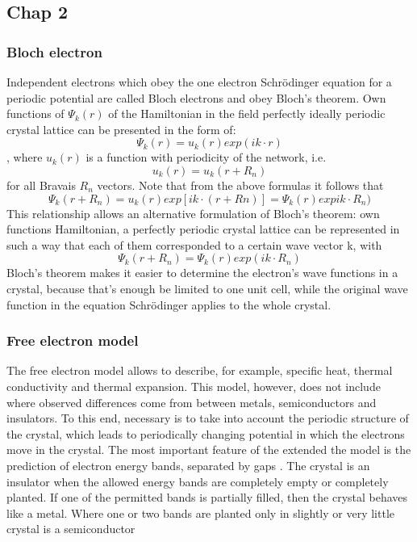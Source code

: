 \subsection{Chap 2} \label{chap2}

\subsubsection*{Bloch electron}
Independent electrons which obey the one electron Schrödinger equation for a periodic potential are called Bloch
electrons and obey Bloch’s theorem. Own functions of $\Psi_k(r)$ of the Hamiltonian in the field perfectly ideally periodic crystal lattice can be presented in the form of:
\begin{equation}
\Psi_k(r) = u_k(r)exp(ik \cdot r)
\end{equation}
, where $u_k(r)$ is a function with periodicity of the network, i.e.
\begin{equation}
u_k(r) = u_k(r + R_n)
\end{equation}
for all Bravais $R_n$ vectors. Note that from the above formulas it follows that
$$
\Psi_k(r+R_n) =  u_k(r)exp[ik\cdot(r+Rn)]= \Psi_k(r)expik\cdot R_n)
$$
This relationship allows an alternative formulation of Bloch's theorem: own functions
Hamiltonian, a perfectly periodic crystal lattice can be represented in such a way that each
of them corresponded to a certain wave vector k, with
$$
\Psi_k(r+R_n) = \Psi_k(r)exp(ik \cdot R_n)
$$
Bloch's theorem makes it easier to determine the electron's wave functions in a crystal, because that's enough
be limited to one unit cell, while the original wave function in the equation
Schrödinger applies to the whole crystal.

\subsubsection*{Free electron model}

The free electron model allows to describe, for example,
specific heat, thermal conductivity and thermal expansion. This model, however, does not include where observed differences come from between metals, semiconductors and insulators. To this end, necessary
is to take into account the periodic structure of the crystal, which leads to periodically changing
potential in which the electrons move in the crystal. The most important feature of the extended
the model is the prediction of electron energy bands,
separated by gaps . The crystal is an insulator when the allowed energy bands are completely empty
or completely planted. If one of the permitted bands is partially filled, then
the crystal behaves like a metal. Where one or two bands are planted only in
slightly or very little crystal is a semiconductor

